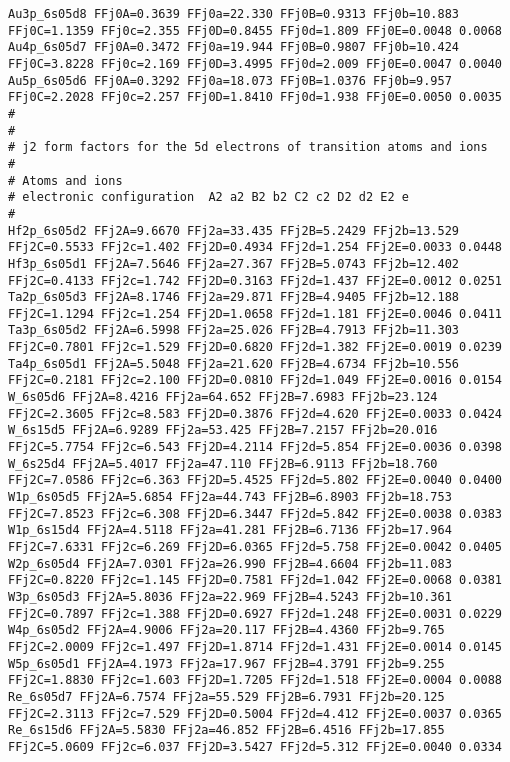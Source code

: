 {\begin{verbatim}
Au3p_6s05d8 FFj0A=0.3639 FFj0a=22.330 FFj0B=0.9313 FFj0b=10.883 FFj0C=1.1359 FFj0c=2.355 FFj0D=0.8455 FFj0d=1.809 FFj0E=0.0048 0.0068
Au4p_6s05d7 FFj0A=0.3472 FFj0a=19.944 FFj0B=0.9807 FFj0b=10.424 FFj0C=3.8228 FFj0c=2.169 FFj0D=3.4995 FFj0d=2.009 FFj0E=0.0047 0.0040
Au5p_6s05d6 FFj0A=0.3292 FFj0a=18.073 FFj0B=1.0376 FFj0b=9.957  FFj0C=2.2028 FFj0c=2.257 FFj0D=1.8410 FFj0d=1.938 FFj0E=0.0050 0.0035
#
#
# j2 form factors for the 5d electrons of transition atoms and ions 
#
# Atoms and ions
# electronic configuration  A2 a2 B2 b2 C2 c2 D2 d2 E2 e
#
Hf2p_6s05d2 FFj2A=9.6670 FFj2a=33.435 FFj2B=5.2429 FFj2b=13.529 FFj2C=0.5533 FFj2c=1.402 FFj2D=0.4934 FFj2d=1.254 FFj2E=0.0033 0.0448 
Hf3p_6s05d1 FFj2A=7.5646 FFj2a=27.367 FFj2B=5.0743 FFj2b=12.402 FFj2C=0.4133 FFj2c=1.742 FFj2D=0.3163 FFj2d=1.437 FFj2E=0.0012 0.0251 
Ta2p_6s05d3 FFj2A=8.1746 FFj2a=29.871 FFj2B=4.9405 FFj2b=12.188 FFj2C=1.1294 FFj2c=1.254 FFj2D=1.0658 FFj2d=1.181 FFj2E=0.0046 0.0411 
Ta3p_6s05d2 FFj2A=6.5998 FFj2a=25.026 FFj2B=4.7913 FFj2b=11.303 FFj2C=0.7801 FFj2c=1.529 FFj2D=0.6820 FFj2d=1.382 FFj2E=0.0019 0.0239 
Ta4p_6s05d1 FFj2A=5.5048 FFj2a=21.620 FFj2B=4.6734 FFj2b=10.556 FFj2C=0.2181 FFj2c=2.100 FFj2D=0.0810 FFj2d=1.049 FFj2E=0.0016 0.0154 
W_6s05d6 FFj2A=8.4216 FFj2a=64.652 FFj2B=7.6983 FFj2b=23.124 FFj2C=2.3605 FFj2c=8.583 FFj2D=0.3876 FFj2d=4.620 FFj2E=0.0033 0.0424 
W_6s15d5 FFj2A=6.9289 FFj2a=53.425 FFj2B=7.2157 FFj2b=20.016 FFj2C=5.7754 FFj2c=6.543 FFj2D=4.2114 FFj2d=5.854 FFj2E=0.0036 0.0398 
W_6s25d4 FFj2A=5.4017 FFj2a=47.110 FFj2B=6.9113 FFj2b=18.760 FFj2C=7.0586 FFj2c=6.363 FFj2D=5.4525 FFj2d=5.802 FFj2E=0.0040 0.0400 
W1p_6s05d5 FFj2A=5.6854 FFj2a=44.743 FFj2B=6.8903 FFj2b=18.753 FFj2C=7.8523 FFj2c=6.308 FFj2D=6.3447 FFj2d=5.842 FFj2E=0.0038 0.0383 
W1p_6s15d4 FFj2A=4.5118 FFj2a=41.281 FFj2B=6.7136 FFj2b=17.964 FFj2C=7.6331 FFj2c=6.269 FFj2D=6.0365 FFj2d=5.758 FFj2E=0.0042 0.0405 
W2p_6s05d4 FFj2A=7.0301 FFj2a=26.990 FFj2B=4.6604 FFj2b=11.083 FFj2C=0.8220 FFj2c=1.145 FFj2D=0.7581 FFj2d=1.042 FFj2E=0.0068 0.0381 
W3p_6s05d3 FFj2A=5.8036 FFj2a=22.969 FFj2B=4.5243 FFj2b=10.361 FFj2C=0.7897 FFj2c=1.388 FFj2D=0.6927 FFj2d=1.248 FFj2E=0.0031 0.0229 
W4p_6s05d2 FFj2A=4.9006 FFj2a=20.117 FFj2B=4.4360 FFj2b=9.765 FFj2C=2.0009 FFj2c=1.497 FFj2D=1.8714 FFj2d=1.431 FFj2E=0.0014 0.0145 
W5p_6s05d1 FFj2A=4.1973 FFj2a=17.967 FFj2B=4.3791 FFj2b=9.255 FFj2C=1.8830 FFj2c=1.603 FFj2D=1.7205 FFj2d=1.518 FFj2E=0.0004 0.0088 
Re_6s05d7 FFj2A=6.7574 FFj2a=55.529 FFj2B=6.7931 FFj2b=20.125 FFj2C=2.3113 FFj2c=7.529 FFj2D=0.5004 FFj2d=4.412 FFj2E=0.0037 0.0365 
Re_6s15d6 FFj2A=5.5830 FFj2a=46.852 FFj2B=6.4516 FFj2b=17.855 FFj2C=5.0609 FFj2c=6.037 FFj2D=3.5427 FFj2d=5.312 FFj2E=0.0040 0.0334 

\end{verbatim}}
